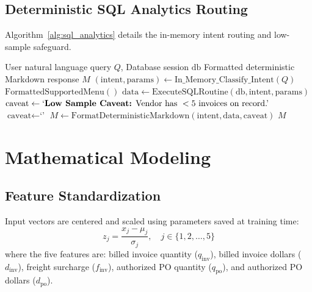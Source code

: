 \documentclass[conference]{IEEEtran}
\begin{document}
\subsection{Deterministic SQL Analytics Routing}
Algorithm~\ref{alg:sql_analytics} details the in-memory intent routing and low-sample safeguard.

\begin{algorithm}[t]
\caption{Deterministic SQL Analytics Assistant}
\label{alg:sql_analytics}
\begin{algorithmic}[1]
\REQUIRE User natural language query $Q$, Database session $\text{db}$
\ENSURE Formatted deterministic Markdown response $M$
\STATE $(\text{intent}, \text{params}) \leftarrow \text{In\_Memory\_Classify\_Intent}(Q)$
    \RETURN $\text{FormattedSupportedMenu}()$
\ENDIF
\STATE $\text{data} \leftarrow \text{ExecuteSQLRoutine}(\text{db}, \text{intent}, \text{params})$
    \STATE $\text{caveat} \leftarrow \text{`\textbf{Low Sample Caveat:} Vendor has } < 5\text{ invoices on record.'}$
\ELSE
    \STATE $\text{caveat} \leftarrow \text{`'}$
\ENDIF
\STATE $M \leftarrow \text{FormatDeterministicMarkdown}(\text{intent}, \text{data}, \text{caveat})$
\RETURN $M$ 
\end{algorithmic}
\end{algorithm}

\section{Mathematical Modeling}

\subsection{Feature Standardization}
Input vectors are centered and scaled using parameters saved at training time:
\begin{equation}
z_j = \frac{x_j - \mu_j}{\sigma_j}, \quad j \in \{1, 2, \dots, 5\}
\end{equation}
where the five features are: billed invoice quantity ($q_{\text{inv}}$), billed invoice dollars ($d_{\text{inv}}$), freight surcharge ($f_{\text{inv}}$), authorized PO quantity ($q_{\text{po}}$), and authorized PO dollars ($d_{\text{po}}$).
\end{document}
